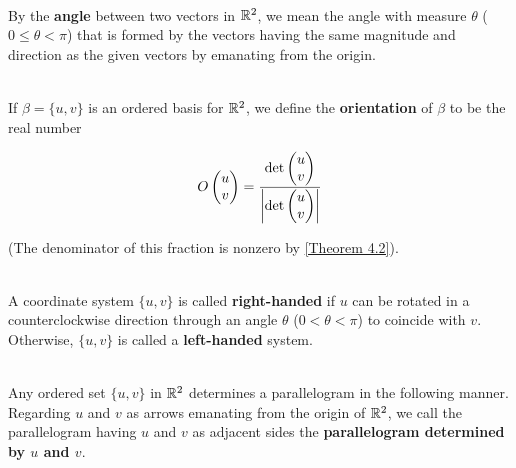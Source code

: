 \begin{definition}
	\hfill\\
	By the \textbf{angle} between two vectors in $\mathbb{R}^2$, we mean the angle with measure $\theta$ ($0 \leq \theta < \pi$) that is formed by the vectors having the same magnitude and direction as the given vectors by emanating from the origin.
\end{definition}

\begin{definition}
	\hfill\\
	If $\beta = \{u,v\}$ is an ordered basis for $\mathbb{R}^2$, we define the \textbf{orientation} of $\beta$ to be the real number
	
	\[O\begin{pmatrix}
		u \\ v
	\end{pmatrix} = \frac{\det\begin{pmatrix}
		u \\ v
		\end{pmatrix}}{\left\lvert \det\begin{pmatrix}
			u \\ v
	\end{pmatrix} \right\rvert}\]

	(The denominator of this fraction is nonzero by \autoref{Theorem 4.2}).
\end{definition}

\begin{definition}
	\hfill\\
	A coordinate system $\{u, v\}$ is called \textbf{right-handed} if $u$ can be rotated in a counterclockwise direction through an angle $\theta$ ($0 < \theta < \pi$) to coincide with $v$. Otherwise, $\{u ,v\}$ is called a \textbf{left-handed} system.
\end{definition}

\begin{definition}
	\hfill\\
	Any ordered set $\{u, v\}$ in $\mathbb{R}^2$ determines a parallelogram in the following manner. Regarding $u$ and $v$ as arrows emanating from the origin of $\mathbb{R}^2$, we call the parallelogram having $u$ and $v$ as adjacent sides the \textbf{parallelogram determined by $u$ and $v$}.
\end{definition}